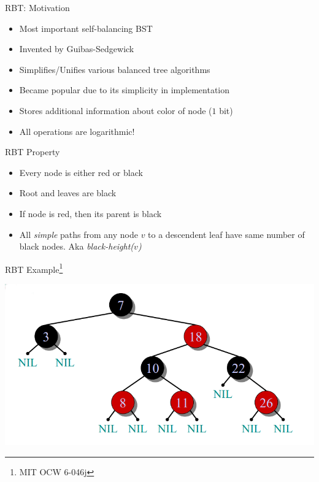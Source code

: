\documentclass{beamer}
\begin{document}
\begin{frame}{RBT: Motivation}
    \begin{itemize}
        \item Most important self-balancing BST
        \item Invented by Guibas-Sedgewick
        \item Simplifies/Unifies various balanced tree algorithms
        \item Became popular due to its simplicity in implementation
        \item Stores additional information about color of node ($1$ bit)
        \item All operations are logarithmic!
    \end{itemize}
\end{frame}


\begin{frame}{RBT Property}
    \begin{itemize}
        \item Every node is either red or black
        \item Root and leaves are black
        \item If node is red, then its parent is black
        \item All {\em simple} paths from any node $v$ to a descendent leaf have same number of black nodes. Aka {\em black-height($v$)}
    \end{itemize}
\end{frame}


\begin{frame}{RBT Example\footnote{MIT OCW 6-046j}}
    \begin{center}
        \includegraphics[scale=0.4]{rbtEg1.png}
    \end{center}
\end{frame}
\end{document}
